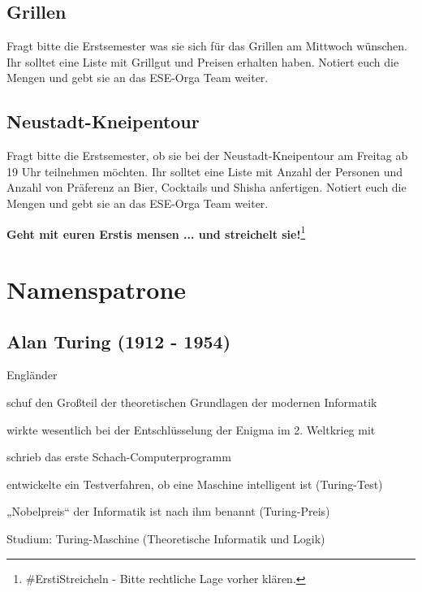 \documentclass[a4paper,12pt]{report}
\begin{document}
\section{Grillen}
Fragt bitte die Erstsemester was sie sich für das Grillen am Mittwoch wünschen. Ihr solltet eine Liste mit Grillgut und Preisen erhalten haben. Notiert euch die Mengen und gebt sie an das ESE-Orga Team weiter.

\section{Neustadt-Kneipentour}
Fragt bitte die Erstsemester, ob sie bei der Neustadt-Kneipentour am Freitag ab 19 Uhr teilnehmen möchten. Ihr solltet eine Liste mit Anzahl der Personen und Anzahl von Präferenz an Bier, Cocktails und Shisha anfertigen. Notiert euch die Mengen und gebt sie an das ESE-Orga Team weiter.

\bigskip
\bigskip
\begin{center}
\huge{\textbf{Geht mit euren Erstis mensen ... und streichelt sie!}}\footnote[42]{\#ErstiStreicheln - Bitte rechtliche Lage vorher klären.}
\end{center}
\chapter{Namenspatrone}
\section*{Alan Turing (1912 - 1954)}
\begin{itemize*}
    \item Engländer
    \item schuf den Großteil der theoretischen Grundlagen der modernen Informatik
    \item wirkte wesentlich bei der Entschlüsselung der Enigma im 2. Weltkrieg mit
    \item schrieb das erste Schach-Computerprogramm
    \item entwickelte ein Testverfahren, ob eine Maschine intelligent ist (Turing-Test)
    \item „Nobelpreis“ der Informatik ist nach ihm benannt (Turing-Preis)
    \item Studium: Turing-Maschine (Theoretische Informatik und Logik)
\end{itemize*}
\end{document}

